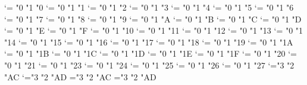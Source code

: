 \XeTeXmathcode`\Γ = "0 "1 "0
\XeTeXmathcode`\Δ = "0 "1 "1
\XeTeXmathcode`\Θ = "0 "1 "2
\XeTeXmathcode`\Λ = "0 "1 "3
\XeTeXmathcode`\Ξ = "0 "1 "4
\XeTeXmathcode`\Π = "0 "1 "5
\XeTeXmathcode`\Σ = "0 "1 "6
\XeTeXmathcode`\Τ = "0 "1 "7
\XeTeXmathcode`\Φ = "0 "1 "8
\XeTeXmathcode`\Ψ = "0 "1 "9
\XeTeXmathcode`\Ω = "0 "1 "A
\XeTeXmathcode`\α = "0 "1 "B
\XeTeXmathcode`\β = "0 "1 "C
\XeTeXmathcode`\γ = "0 "1 "D
\XeTeXmathcode`\δ = "0 "1 "E
\XeTeXmathcode`\ε = "0 "1 "F
%
\XeTeXmathcode`\ζ = "0 "1 "10
\XeTeXmathcode`\η = "0 "1 "11
\XeTeXmathcode`\θ = "0 "1 "12
\XeTeXmathcode`\ι = "0 "1 "13
\XeTeXmathcode`\κ = "0 "1 "14
\XeTeXmathcode`\λ = "0 "1 "15
\XeTeXmathcode`\μ = "0 "1 "16
\XeTeXmathcode`\ν = "0 "1 "17
\XeTeXmathcode`\ξ = "0 "1 "18
\XeTeXmathcode`\π = "0 "1 "19
\XeTeXmathcode`\ρ = "0 "1 "1A
\XeTeXmathcode`\σ = "0 "1 "1B
\XeTeXmathcode`\τ = "0 "1 "1C
\XeTeXmathcode`\υ = "0 "1 "1D
\XeTeXmathcode`\ϕ = "0 "1 "1E
\XeTeXmathcode`\χ = "0 "1 "1F
%
\XeTeXmathcode`\ψ = "0 "1 "20
\XeTeXmathcode`\ω = "0 "1 "21
\XeTeXmathcode`\ϑ = "0 "1 "23
\XeTeXmathcode`\ϖ = "0 "1 "24
\XeTeXmathcode`\ϱ = "0 "1 "25
\XeTeXmathcode`\ς = "0 "1 "26
\XeTeXmathcode`\φ = "0 "1 "27
\XeTeXmathcode`\⩽="3 "2 "AC
\XeTeXmathcode`\⩾="3 "2 "AD
\XeTeXmathchardef\xleq="3 "2 "AC \let\xle=\xleq
\XeTeXmathchardef\xgeq="3 "2 "AD \let\xge=\xgeq
%
\endinput
